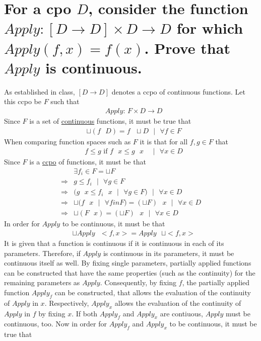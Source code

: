 \section{For a cpo $D$, consider the function $Apply: [D \rightarrow D] \times D \rightarrow D$ for which $Apply (f, x) = f(x)$. Prove that $Apply$ is continuous.}

As established in class, $[D \rightarrow D]$  denotes a ccpo of continuous functions. Let this ccpo be $F$ such that
\begin{align}
	& Apply \text{: } F \times D \rightarrow D
\end{align}
Since $F$ is a set of \underline{continuous} functions, it must be true that
\begin{align}
	& \sqcup ( f \text{ } D ) = f \text{ } \sqcup D \text{ } | \text{ } \forall f \in F \label{eq:cont:given:x}
\end{align}
When comparing function spaces such as $F$ it is that for all $f,g \in F$ that
\begin{align}
	& f \leq g \text{ if } f \text{ } x \leq g \text{ } x \text{ } \text{ } | \text{ } \forall x \in D
\end{align}
Since $F$ is a \underline{ccpo} of functions, it must be that
\begin{align}
						& \exists f_i \in F = \sqcup F \\
\Rightarrow & g \leq f_i \text{ } | \text{ } \forall g \in F \\
\Rightarrow & ( g \text{ } x \leq f_i \text{ } x \text{ } | \text{ } \forall g \in F ) \text{ } | \text{ } \forall x \in D \\
\Rightarrow	& \sqcup ( f \text{ } x \text{ } | \text{ } \forall f in F ) = ( \sqcup F ) \text{ } x \text{ } | \text{ } \forall x \in D \\
\Rightarrow	& \sqcup ( F \text{ } x ) = (\sqcup F) \text{ } x \text{ } | \text{ } \forall x \in D \label{eq:cont:given:f}
\end{align}
In order for $Apply$ to be continuous, it must be that
\begin{align}
	& \sqcup Apply \text{ } <f,x> = Apply \text{ } \sqcup <f,x>
\end{align}
It is given that a function is continuous if it is continuous in each of its parameters. Therefore, if $Apply$ is continuous in its parameters, it must be continuous itself as well. By fixing single parameters, partially applied functions can be constructed that have the same properties (such as the continuity) for the remaining parameters as $Apply$. Consequently, by fixing $f$, the partially applied function $Apply_f$ can be constructed, that allows the evaluation of the continuity of $Apply$ in $x$. Respectively, $Apply_x$ allows the evaluation of the continuity of $Apply$ in $f$ by fixing $x$. If both $Apply_f$ and $Apply_x$ are contiuous, $Apply$ must be continuous, too. Now in order for $Apply_f$ and $Apply_x$ to be continuous, it must be true that
